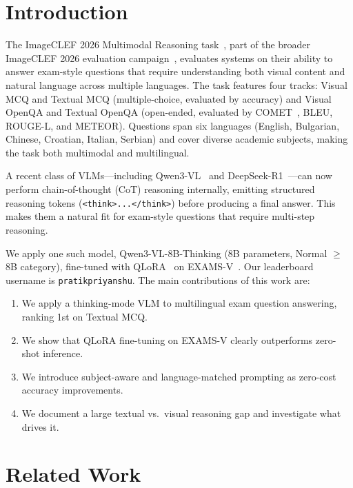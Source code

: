 \documentclass[]{ceurart}
\begin{document}
\section{Introduction}
\label{sec:intro}

The ImageCLEF 2026 Multimodal Reasoning task~\cite{ImageCLEFMR2026}, part of the broader ImageCLEF 2026 evaluation campaign~\cite{ImageCLEF2026}, evaluates systems on their ability to answer exam-style questions that require understanding both visual content and natural language across multiple languages.
The task features four tracks: Visual MCQ and Textual MCQ (multiple-choice, evaluated by accuracy) and Visual OpenQA and Textual OpenQA (open-ended, evaluated by COMET~\cite{comet}, BLEU, ROUGE-L, and METEOR).
Questions span six languages (English, Bulgarian, Chinese, Croatian, Italian, Serbian) and cover diverse academic subjects, making the task both multimodal and multilingual.

A recent class of VLMs---including Qwen3-VL~\cite{qwen3} and DeepSeek-R1~\cite{deepseekr1}---can now perform chain-of-thought (CoT) reasoning internally, emitting structured reasoning tokens (\texttt{<think>...\allowbreak</think>}) before producing a final answer.
This makes them a natural fit for exam-style questions that require multi-step reasoning.

We apply one such model, Qwen3-VL-8B-Thinking (8B parameters, Normal $\geq$8B category), fine-tuned with QLoRA~\cite{qlora} on EXAMS-V~\cite{examsv}.
Our leaderboard username is \texttt{pratikpriyanshu}.
The main contributions of this work are:
\begin{enumerate}
    \item We apply a thinking-mode VLM to multilingual exam question answering, ranking 1st on Textual MCQ.
    \item We show that QLoRA fine-tuning on EXAMS-V clearly outperforms zero-shot inference.
    \item We introduce subject-aware and language-matched prompting as zero-cost accuracy improvements.
    \item We document a large textual vs.\ visual reasoning gap and investigate what drives it.
\end{enumerate}


\section{Related Work}
\label{sec:related}
\end{document}
